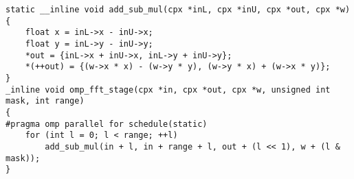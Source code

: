 \begin{lstlisting}
static __inline void add_sub_mul(cpx *inL, cpx *inU, cpx *out, cpx *w)
{
    float x = inL->x - inU->x;
    float y = inL->y - inU->y;
    *out = {inL->x + inU->x, inL->y + inU->y};
    *(++out) = {(w->x * x) - (w->y * y), (w->y * x) + (w->x * y)};
}
_inline void omp_fft_stage(cpx *in, cpx *out, cpx *w, unsigned int mask, int range)
{
#pragma omp parallel for schedule(static)
    for (int l = 0; l < range; ++l)
        add_sub_mul(in + l, in + range + l, out + (l << 1), w + (l & mask));
}
\end{lstlisting}